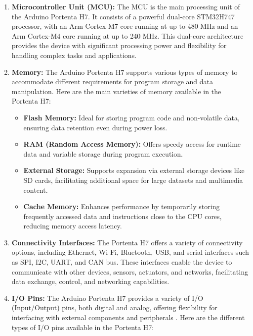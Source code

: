 \begin{enumerate}
	\item \textbf{Microcontroller Unit (MCU):} The MCU is the main processing unit of the Arduino Portenta H7. It consists of a powerful dual-core STM32H747 processor, with an Arm Cortex-M7 core running at up to 480 MHz and an Arm Cortex-M4 core running at up to 240 MHz. This dual-core architecture provides the device with significant processing power and flexibility for handling complex tasks and applications. \cite{arduinoABX00042:2024} 
	
	\item \textbf{Memory:} The Arduino Portenta H7 supports various types of memory to accommodate different requirements for program storage and data manipulation. Here are the main varieties of memory available in the Portenta H7:
	
	\begin{itemize}
		\item \textbf{Flash Memory:} Ideal for storing program code and non-volatile data, ensuring data retention even during power loss.
		
		\item \textbf{RAM (Random Access Memory):} Offers speedy access for runtime data and variable storage during program execution.
		
		\item \textbf{External Storage:} Supports expansion via external storage devices like SD cards, facilitating additional space for large datasets and multimedia content.
		
		\item \textbf{Cache Memory:} Enhances performance by temporarily storing frequently accessed data and instructions close to the CPU cores, reducing memory access latency.
	\end{itemize}
	
	
	\item \textbf{Connectivity Interfaces:} The Portenta H7 offers a variety of connectivity options, including Ethernet, Wi-Fi, Bluetooth, USB, and serial interfaces such as SPI, I2C, UART, and CAN bus. These interfaces enable the device to communicate with other devices, sensors, actuators, and networks, facilitating data exchange, control, and networking capabilities.
	
	\item \textbf{I/O Pins:} The Arduino Portenta H7 provides a variety of I/O (Input/Output) pins, both digital and analog, offering flexibility for interfacing with external components and peripherals \cite{arduinoABX00042:2024}. Here are the different types of I/O pins available in the Portenta H7:
	

\end{enumerate}
